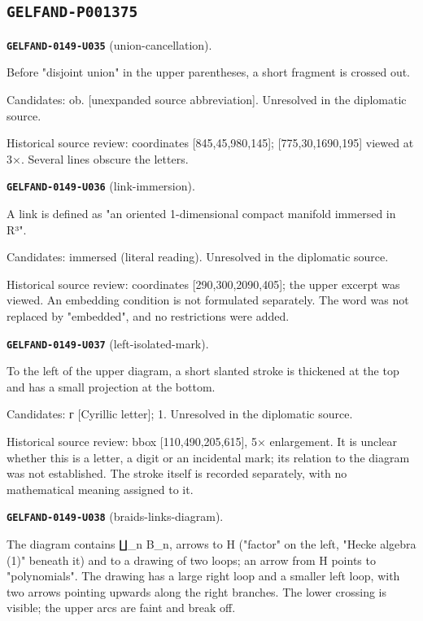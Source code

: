 \documentclass[11pt]{article}
\theoremstyle{definition}
\theoremstyle{remark}
\begin{document}
\subsection*{\texttt{GELFAND-P001375}}
\noindent\leavevmode{}\label{GELFAND-P001375:union-cancellation:note}\textbf{\texttt{GELFAND-0149-U035}} (union-cancellation).\par\nopagebreak[4]
Before "disjoint union" in the upper parentheses, a short fragment is crossed out.\par
Candidates: ob. [unexpanded source abbreviation]. Unresolved in the diplomatic source.\par
Historical source review: coordinates [845,45,980,145]; [775,30,1690,195] viewed at 3×. Several lines obscure the letters.\par\medskip
\noindent\leavevmode{}\label{GELFAND-P001375:link-immersion:note}\textbf{\texttt{GELFAND-0149-U036}} (link-immersion).\par\nopagebreak[4]
A link is defined as "an oriented 1-dimensional compact manifold immersed in R³".\par
Candidates: immersed (literal reading). Unresolved in the diplomatic source.\par
Historical source review: coordinates [290,300,2090,405]; the upper excerpt was viewed. An embedding condition is not formulated separately. The word was not replaced by "embedded", and no restrictions were added.\par\medskip
\noindent\leavevmode{}\label{GELFAND-P001375:left-isolated-mark:note}\textbf{\texttt{GELFAND-0149-U037}} (left-isolated-mark).\par\nopagebreak[4]
To the left of the upper diagram, a short slanted stroke is thickened at the top and has a small projection at the bottom.\par
Candidates: г [Cyrillic letter]; 1. Unresolved in the diplomatic source.\par
Historical source review: bbox [110,490,205,615], 5× enlargement. It is unclear whether this is a letter, a digit or an incidental mark; its relation to the diagram was not established. The stroke itself is recorded separately, with no mathematical meaning assigned to it.\par\medskip
\noindent\leavevmode{}\label{GELFAND-P001375:braids-links-diagram:note}\textbf{\texttt{GELFAND-0149-U038}} (braids-links-diagram).\par\nopagebreak[4]
The diagram contains ∐\_n B\_n, arrows to H ("factor" on the left, "Hecke algebra (1)" beneath it) and to a drawing of two loops; an arrow from H points to "polynomials". The drawing has a large right loop and a smaller left loop, with two arrows pointing upwards along the right branches. The lower crossing is visible; the upper arcs are faint and break off.\par
\end{document}
